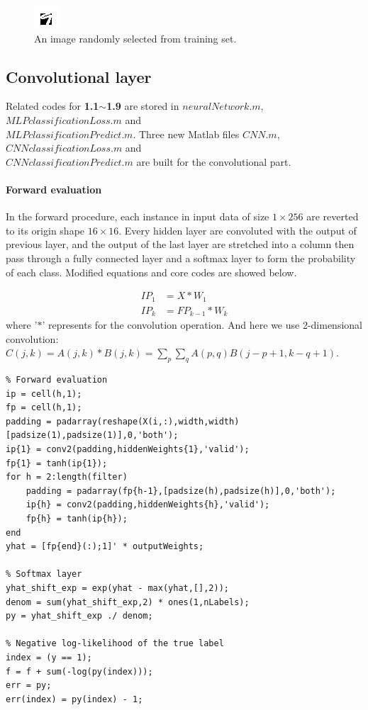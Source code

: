 \documentclass{article}
\begin{document}
\begin{figure}[H]
	\centering
	\includegraphics[scale=3]{figure7}
	\caption{An image randomly selected from training set.}
	\label{fig7}
\end{figure}


\subsection{Convolutional layer}
Related codes for \textbf{1.1$\sim$1.9} are stored in $neuralNetwork.m$, $MLPclassificationLoss.m$ and\\ $MLPclassificationPredict.m$. Three new Matlab files $CNN.m$, $CNNclassificationLoss.m$ and\\ $CNNclassificationPredict.m$ are built for the convolutional part.

\paragraph{Forward evaluation}
In the forward procedure, each instance in input data of size $1\times 256$ are reverted to its origin shape $16\times 16$. Every hidden layer are convoluted with the output of previous layer, and the output of the last layer are stretched into a column then pass through a fully connected layer and a softmax layer to form the probability of each class. Modified equations and core codes are showed below.

\[
\begin{aligned}
IP_1&=X\ast W_1\\
IP_k&=FP_{k-1}\ast W_k
\end{aligned}
\]
where '$\ast$' represents for the convolution operation. And here we use 2-dimensional convolution: $C(j,k)=A(j,k)*B(j,k)=\sum_p\sum_qA(p,q)B(j-p+1,k-q+1)$.



\begin{lstlisting}
% Forward evaluation
ip = cell(h,1);
fp = cell(h,1);
padding = padarray(reshape(X(i,:),width,width)[padsize(1),padsize(1)],0,'both');
ip{1} = conv2(padding,hiddenWeights{1},'valid');
fp{1} = tanh(ip{1});
for h = 2:length(filter)
	padding = padarray(fp{h-1},[padsize(h),padsize(h)],0,'both');
    ip{h} = conv2(padding,hiddenWeights{h},'valid');
    fp{h} = tanh(ip{h});
end
yhat = [fp{end}(:);1]' * outputWeights;
    
% Softmax layer
yhat_shift_exp = exp(yhat - max(yhat,[],2));
denom = sum(yhat_shift_exp,2) * ones(1,nLabels);
py = yhat_shift_exp ./ denom;
    
% Negative log-likelihood of the true label
index = (y == 1);
f = f + sum(-log(py(index)));
err = py;
err(index) = py(index) - 1;
\end{lstlisting}
\end{document}
